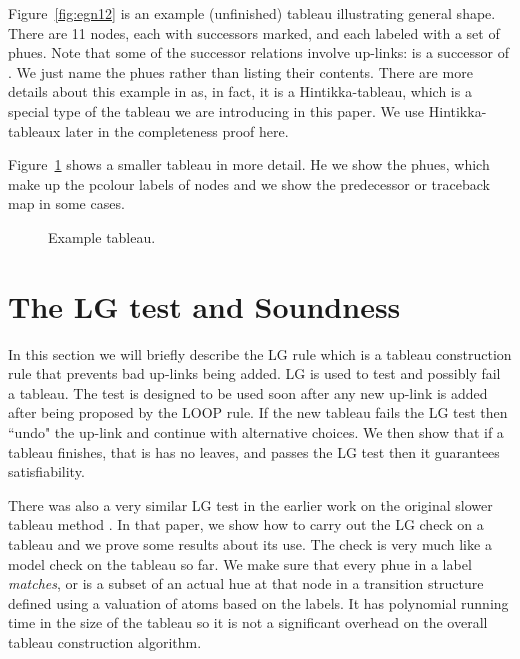 \documentclass[submission,copyright,creativecommons]{eptcs}
\begin{document}
Figure~\ref{fig:egn12}
is an example (unfinished) tableau 
illustrating general shape.
There are 11 nodes, 
each with successors marked,
and each labeled with a set of phues.
Note that some of the successor relations involve up-links:
 is a successor of .
We just name the phues rather than listing their contents.
There are more details about this example
in \cite{Rey:startab} as, in fact, it is
a Hintikka-tableau,
which is a special type of the tableau
we are introducing in this paper.
We use Hintikka-tableaux later in the
completeness proof here.

Figure~\ref{fig:meg}
shows a smaller tableau in more detail.
He we show the phues, which make up the pcolour labels
of nodes
and we show the predecessor or traceback map
in some cases.

\begin{figure}




\caption{Example tableau.}

\label{fig:meg}
\end{figure}



\section{The LG test and Soundness}
\label{sec:lg}

In this section we will 
briefly describe the LG rule which is a tableau construction rule 
that prevents bad up-links being added.
LG
is used to test and possibly fail a tableau.
The test is designed to be used 
soon after any new up-link is
added after being proposed by the LOOP rule.
If the new tableau fails the LG test  then ``undo" the up-link and 
continue with alternative choices.
We then show that if a tableau finishes,
that is has no leaves, and passes the LG test
then it guarantees satisfiability.

There was also a very similar LG test in 
the earlier work on the original slower tableau method
\cite{Rey:startab}.
In that paper,
we show how to carry out the LG check 
on a tableau and we prove some results about
its use. 
The check is very much like a model check on the tableau so far.
We make sure that 
every phue in a label {\em matches},
or is a subset of an actual hue at that node
in a transition structure defined using
a valuation of atoms based on the labels.
It has polynomial running time in the size of the tableau so it is not a 
significant overhead on the overall tableau construction algorithm.
\end{document}
